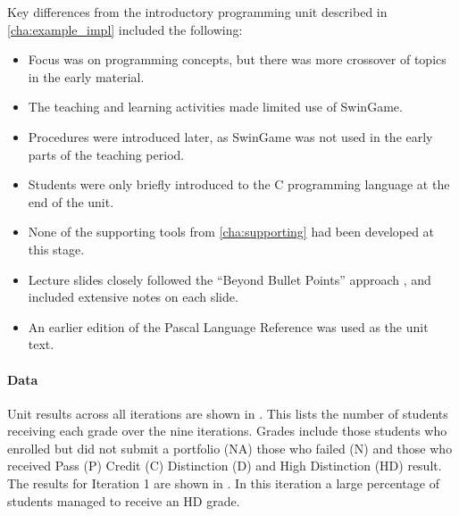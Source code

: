 Key differences from the introductory programming unit described in \cref{cha:example_impl} included the following:
\begin{itemize}[noitemsep,nolistsep]
	\item Focus was on programming concepts, but there was more crossover of topics in the early material.
	\item The teaching and learning activities made limited use of SwinGame.
	\item Procedures were introduced later, as SwinGame was not used in the early parts of the teaching period. 
	\item Students were only briefly introduced to the C programming language at the end of the unit.
	\item None of the supporting tools from \cref{cha:supporting} had been developed at this stage.
	\item Lecture slides closely followed the ``Beyond Bullet Points'' approach \cite{Atkinson:2007}, and included extensive notes on each slide.
	\item An earlier edition of the Pascal Language Reference \cite{FPC:2013lang} was used as the unit text.
\end{itemize}

\paragraph{Data} %

Unit results across all iterations are shown in . This lists the number of students receiving each grade over the nine iterations. Grades include those students who enrolled but did not submit a portfolio (NA) those who failed (N) and those who received Pass (P) Credit (C) Distinction (D) and High Distinction (HD) result. The results for Iteration 1 are shown in . In this iteration a large percentage of students managed to receive an HD grade.

